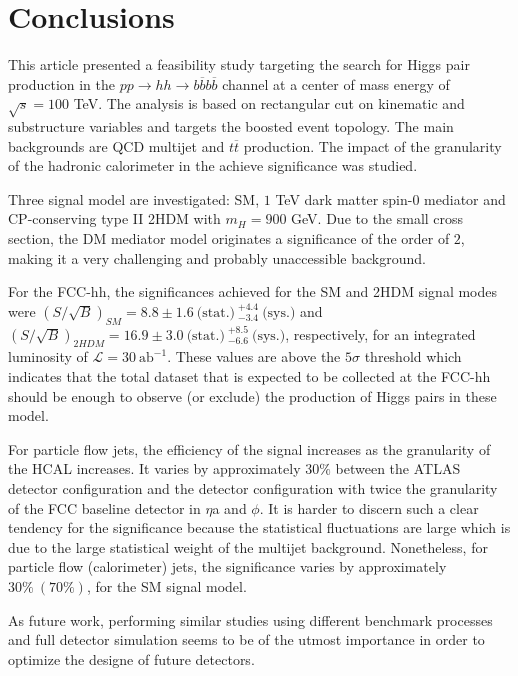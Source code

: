 
\section{Conclusions}
\label{sec:concl}

This article presented a feasibility study targeting the search for Higgs pair production in the $pp\rightarrow hh\rightarrow b\overline{b}b\overline{b}$ channel at a center of mass energy of $\sqrt{s}=100$ TeV. The analysis is based on rectangular cut on kinematic and substructure variables and targets the boosted event topology. The main backgrounds are QCD multijet and $t\overline{t}$ production. The impact of the granularity of the hadronic calorimeter in the achieve significance was studied. 

Three signal model are investigated: SM, $1$ TeV dark matter spin-$0$ mediator and CP-conserving type II 2HDM with $m_H=900$ GeV. Due to the small cross section, the DM mediator model originates a significance of the order of $2$, making it a very challenging and probably unaccessible background. 

For the FCC-hh, the significances achieved for the SM and 2HDM signal modes were $(S/\sqrt{B})_{SM}=8.8\pm 1.6~\text{(stat.)}~^{+4.4}_{-3.4}~\text{(sys.)}$ and $(S/\sqrt{B})_{2HDM}=16.9\pm 3.0~\text{(stat.)}~^{+8.5}_{-6.6}~\text{(sys.)}$, respectively, for an integrated luminosity of $\mathcal{L}=30~\text{ab}^{-1}$. These values are above the $5\sigma$ threshold which indicates that the total dataset that is expected to be collected at the FCC-hh should be enough to observe (or exclude) the production of Higgs pairs in these model.

For particle flow jets, the efficiency of the signal increases as the granularity of the HCAL increases. It varies by approximately $30\%$ between the ATLAS detector configuration and the detector configuration with twice the granularity of the FCC baseline detector in $\eta$a and $\phi$. It is harder to discern such a clear tendency for the significance because the statistical fluctuations are large which is due to the large statistical weight of the multijet background. Nonetheless, for particle flow (calorimeter) jets, the significance varies by approximately $30\%~(70\%)$, for the SM signal model. 

As future work, performing similar studies using different benchmark processes and full detector simulation seems to be of the utmost importance in order to optimize the designe of future detectors.

